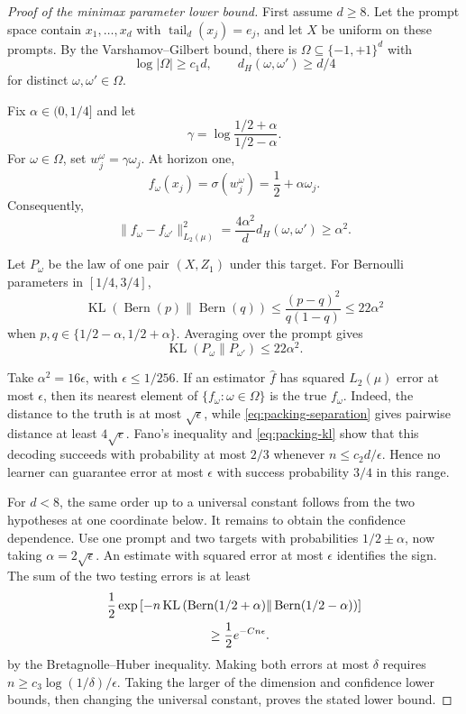 \documentclass[twoside]{article}
\begin{document}
\begin{proof}[Proof of the minimax parameter lower bound]
First assume $d\geq8$. Let the prompt space contain $x_1,\ldots,x_d$ with $\operatorname{tail}_d(x_j)=e_j$, and let $X$ be uniform on these prompts. By the Varshamov--Gilbert bound, there is $\Omega\subseteq\{-1,+1\}^d$ with
\[
 \log|\Omega|\geq c_1d,
 \qquad
 d_H(\omega,\omega')\geq d/4
\]
for distinct $\omega,\omega'\in\Omega$.

Fix $\alpha\in(0,1/4]$ and let
\[
 \gamma=\log\frac{1/2+\alpha}{1/2-\alpha}.
\]
For $\omega\in\Omega$, set $w^\omega_j=\gamma\omega_j$. At horizon one,
\[
 f_\omega(x_j)=\sigma(w^\omega_j)=\frac12+\alpha\omega_j.
\]
Consequently,
\begin{equation}
 \|f_\omega-f_{\omega'}\|_{L_2(\mu)}^2
 =\frac{4\alpha^2}{d}d_H(\omega,\omega')
 \geq\alpha^2.
 \label{eq:packing-separation}
\end{equation}

Let $P_\omega$ be the law of one pair $(X,Z_1)$ under this target. For Bernoulli parameters in $[1/4,3/4]$,
\[
 \operatorname{KL}(\operatorname{Bern}(p)\|\operatorname{Bern}(q))
 \leq\frac{(p-q)^2}{q(1-q)}\leq22\alpha^2
\]
when $p,q\in\{1/2-\alpha,1/2+\alpha\}$. Averaging over the prompt gives
\begin{equation}
 \operatorname{KL}(P_\omega\|P_{\omega'})\leq22\alpha^2.
 \label{eq:packing-kl}
\end{equation}

Take $\alpha^2=16\epsilon$, with $\epsilon\leq1/256$. If an estimator $\widehat f$ has squared $L_2(\mu)$ error at most $\epsilon$, then its nearest element of $\{f_\omega:\omega\in\Omega\}$ is the true $f_\omega$. Indeed, the distance to the truth is at most $\sqrt\epsilon$, while \eqref{eq:packing-separation} gives pairwise distance at least $4\sqrt\epsilon$. Fano's inequality and \eqref{eq:packing-kl} show that this decoding succeeds with probability at most $2/3$ whenever $n\leq c_2d/\epsilon$. Hence no learner can guarantee error at most $\epsilon$ with success probability $3/4$ in this range.

For $d<8$, the same order up to a universal constant follows from the two hypotheses at one coordinate below. It remains to obtain the confidence dependence. Use one prompt and two targets with probabilities $1/2\pm\alpha$, now taking $\alpha=2\sqrt\epsilon$. An estimate with squared error at most $\epsilon$ identifies the sign. The sum of the two testing errors is at least
\[
 \begin{aligned}
 &\frac12\exp\left[-n\operatorname{KL}\left(
 \operatorname{Bern}(1/2+\alpha)\|\operatorname{Bern}(1/2-\alpha)
 \right)\right]\\
 &\hspace{28mm}\geq\frac12e^{-C n\epsilon}.
 \end{aligned}
\]
by the Bretagnolle--Huber inequality. Making both errors at most $\delta$ requires $n\geq c_3\log(1/\delta)/\epsilon$. Taking the larger of the dimension and confidence lower bounds, then changing the universal constant, proves the stated lower bound.
\end{proof}
\end{document}
